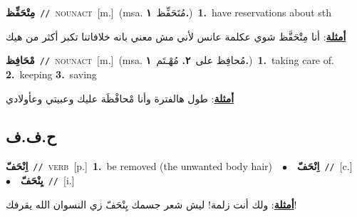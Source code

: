 \documentclass[10pt,a4paper,twoside]{article} %
\begin{document}
\begin{multicols}{2}
{\setlength\topsep{0pt}\textbf{\foreignlanguage{arabic}{مِتْحَفِّظ}}\ {\color{gray}\texttt{//}\color{black}}\ \textsc{noun\textunderscore act}\ [m.]\ \color{gray}(msa. \foreignlanguage{arabic}{مُتَحَفِّظ}~\foreignlanguage{arabic}{\textbf{١.}})\color{black}\ \textbf{1.}~have reservations about sth\  \begin{flushright}\color{gray}\foreignlanguage{arabic}{\textbf{\underline{\foreignlanguage{arabic}{أمثلة}}}: أنا مِتْحَفَّظ شوي عكلمة عانس لأني مش معني بانه خلافاتنا تكبر أكثر من هيك}\end{flushright}\color{black}} \vspace{2mm}

{\setlength\topsep{0pt}\textbf{\foreignlanguage{arabic}{مْحَافِظ}}\ {\color{gray}\texttt{//}\color{black}}\ \textsc{noun\textunderscore act}\ [m.]\ \color{gray}(msa. \foreignlanguage{arabic}{مُحافِظ على}~\foreignlanguage{arabic}{\textbf{٢.}}  \foreignlanguage{arabic}{مُهْـتَم}~\foreignlanguage{arabic}{\textbf{١.}})\color{black}\ \textbf{1.}~taking care of.  \textbf{2.}~keeping  \textbf{3.}~saving\  \begin{flushright}\color{gray}\foreignlanguage{arabic}{\textbf{\underline{\foreignlanguage{arabic}{أمثلة}}}: طول هالفترة وأنا مْحافْظَة عليك وعبيتي وعأولادي}\end{flushright}\color{black}} \vspace{2mm}

\vspace{-3mm}
\subsection*{\color{blue}\foreignlanguage{arabic}{ح.ف.ف}\color{blue}{}} 

{\setlength\topsep{0pt}\textbf{\foreignlanguage{arabic}{اِنْحَفّ}}\ {\color{gray}\texttt{//}\color{black}}\ \textsc{verb}\ [p.]\ \textbf{1.}~be removed (the unwanted body hair)\ \ $\bullet$\ \ \setlength\topsep{0pt}\textbf{\foreignlanguage{arabic}{اِنْحَفّ}}\ {\color{gray}\texttt{//}\color{black}}\ [c.]\ \ $\bullet$\ \ \setlength\topsep{0pt}\textbf{\foreignlanguage{arabic}{يِنْحَفّ}}\ {\color{gray}\texttt{//}\color{black}}\ [i.]\  \begin{flushright}\color{gray}\foreignlanguage{arabic}{\textbf{\underline{\foreignlanguage{arabic}{أمثلة}}}: ولك أنت زلمة! ليش شعر جسمك يِنْحَفّ زي النسوان الله يقرفك!}\end{flushright}\color{black}} \vspace{2mm}


\end{multicols}
\end{document}
